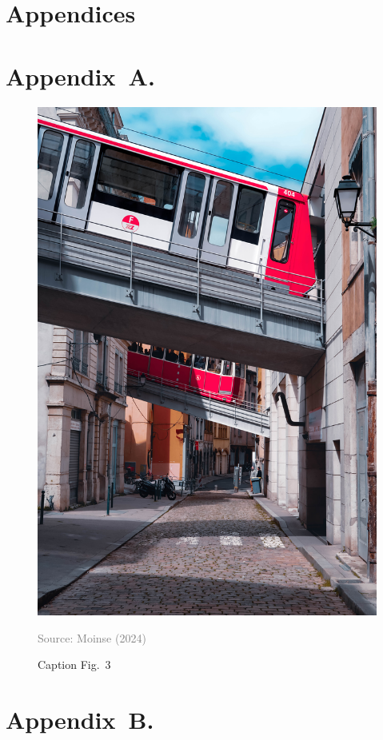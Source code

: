 \documentclass[../main.tex]{subfiles}
\begin{document}
    \newpage
    \onecolumn
    \appendix

\section*{Appendices}
    \label{section:appendices}


    \section*{Appendix~A.}
\addtocounter{section}{2}
\renewcommand{\thesection}{\arabic{section}}
    \label{appendix:1}

\lipsum[1-3]

    \begin{figure}[h!] %
    \centering
\includegraphics[width=0.5\columnwidth]{fig/fig-3.jpg}
\caption{Caption Fig.~3}
    \label{fig:3}
    \begin{flushright}
    \begin{minipage}{1\linewidth}
        \justifying
        \noindent
\tiny{\textcolor{gray}{Source: Moinse (2024)}}
        \end{minipage}
    \end{flushright}
    \end{figure}


    \section*{Appendix~B.}
\addtocounter{section}{1}
\renewcommand{\thesection}{\arabic{section}}
    \label{appendix:2}
\end{document}

